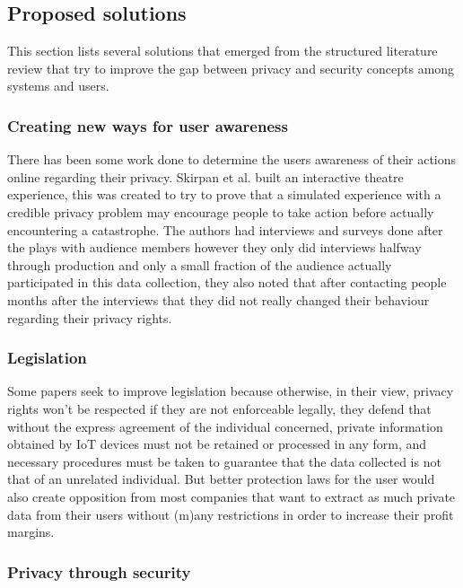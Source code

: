 \documentclass[manuscript,screen,review,natbib=false]{acmart}
\begin{document}
\subsection{Proposed solutions}

\par This section lists several solutions that emerged from the structured
literature review that try to improve the gap between privacy and security concepts
among systems and users.

\subsubsection{Creating new ways for user awareness}

There has been some work done to determine the users awareness of their
actions online regarding their privacy. Skirpan et al. \cite{SkirpanPrivacy}
built an interactive theatre experience, this was created to try to prove
that a simulated experience with a credible privacy problem may encourage
people to take action before actually encountering a catastrophe.
The authors had interviews and surveys
done after the plays with audience members however they only did interviews
halfway through production and only a small fraction of the audience actually
participated in this data collection, they also noted that after contacting
people months after the interviews that they did not really changed their
behaviour regarding their privacy rights.

\subsubsection{Legislation}

Some papers seek to improve legislation \cite{WEBER2015618, FabianoInternet}
because otherwise, in their view, privacy rights won't be respected if they
are not enforceable legally, they defend that without the express agreement
of the individual concerned, private information obtained by IoT devices
must not be retained or processed in any form, and necessary procedures
must be taken to guarantee that the data collected is not that of an unrelated
individual. But better protection laws for the user would also create opposition
from most companies that want to extract as much private data from their
users without (m)any restrictions in order to increase their profit margins.

\subsubsection{Privacy through security}
\end{document}
